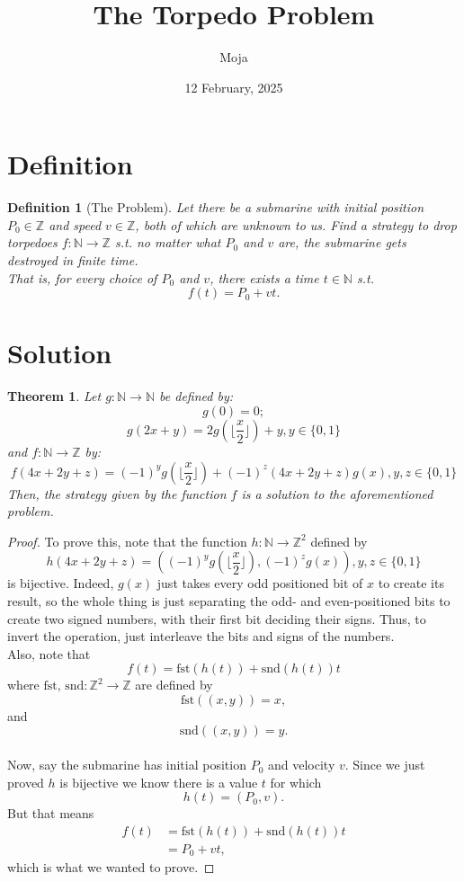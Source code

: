 \documentclass{article}
\title{The Torpedo Problem}
\author{Moja}
\date{12 February, 2025}
\newtheorem{definition}{Definition}[section]
\newtheorem{theorem}{Theorem}[section]
\begin{document}
    \maketitle
    \section{Definition}
    \begin{definition}[The Problem]
        Let there be a submarine with initial position $P_0 \in \mathbb{Z}$ and speed $v \in \mathbb{Z}$, both of which are unknown to us. 
        Find a strategy to drop torpedoes $f: \mathbb{N} \to \mathbb{Z}$ s.t. no matter what $P_0$ and $v$ are, the submarine gets destroyed in finite time. \\
        That is, for every choice of $P_0$ and $v$, there exists a time $t \in \mathbb{N}$ s.t. 
            $$ f(t) = P_0 + vt. $$
    \end{definition}

    \section{Solution}
    \begin{theorem}
	Let $g: \mathbb{N} \to \mathbb{N}$ be defined by: 
             $$ g(0) = 0; $$
	    $$ g(2x+y) = 2g(\lfloor \frac{x}{2} \rfloor) + y, y \in \{ 0, 1 \} $$ 
	and $f: \mathbb{N} \to \mathbb{Z}$ by:
	    $$ f(4x+2y+z) = (-1)^yg(\lfloor \frac{x}{2} \rfloor)+(-1)^z(4x+2y+z)g(x), y,z \in \{ 0, 1 \} $$
	Then, the strategy given by the function $f$ is a solution to the aforementioned problem.
    \end{theorem}
    \begin{proof}
	    To prove this, note that the function $h: \mathbb{N} \to \mathbb{Z}^2$ defined by 
	    $$ h(4x+2y+z) = ((-1)^yg(\lfloor \frac{x}{2} \rfloor), (-1)^zg(x)), y,z \in \{ 0, 1 \} $$
	    is bijective. Indeed, $g(x)$ just takes every odd positioned bit of $x$ to create its result, so the whole thing is just separating the odd- 
	    and even-positioned bits to create two signed numbers, with their first bit deciding their signs. Thus, to invert the operation, 
	    just interleave the bits and signs of the numbers.\\

	    Also, note that $$f(t) = \text{fst}(h(t)) + \text{snd}(h(t))t$$ where $\text{fst, snd}: \mathbb{Z}^2 \to \mathbb{Z}$ are defined by 
	    $$ \text{fst}((x, y)) = x, $$ and $$ \text{snd}((x, y)) = y. $$ \\
	    Now, say the submarine has initial position $P_0$ and velocity $v.$ Since we just proved $h$ is bijective we know there is a value $t$ for 
	    which $$h(t) = (P_0, v). $$ But that means 
\begin{equation}
\begin{aligned}
f(t) &= \text{fst}(h(t))+\text{snd}(h(t))t \\
&= P_0 + vt,
\end{aligned}
\end{equation}
 which is what we wanted to prove.
    \end{proof}
\end{document}
